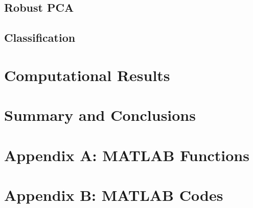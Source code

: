 \documentclass{article}
\begin{document}
\subsection{Robust PCA}

\subsection{Classification}

\section{Computational Results}

\section{Summary and Conclusions}

\section*{Appendix A: MATLAB Functions}

\section*{Appendix B: MATLAB Codes}

\end{document}
